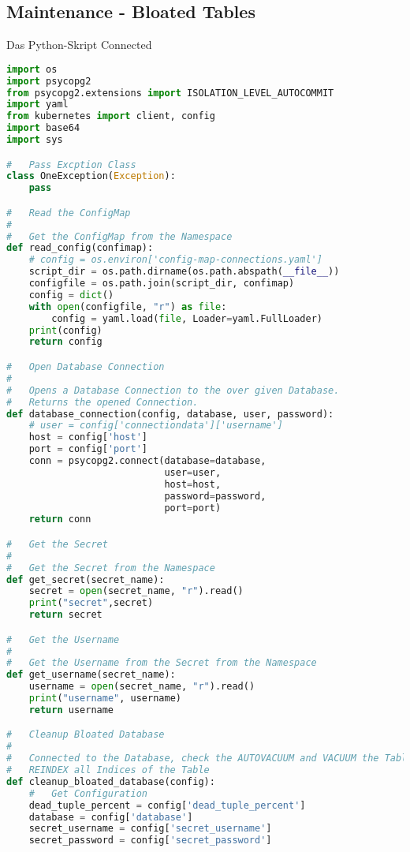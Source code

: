 
\begin{flushleft}
    \subsection{Maintenance - Bloated Tables}
    Das Python-Skript Connected
    \lstset{style=gra_codestyle}
    \begin{lstlisting}[language=python, caption=Maintenance-Tool - Bloated Tables / Indices - ksgr\_postgresql\_maintenance\_bloated\_tables.py,captionpos=b,label={lst:maintenannce-tool-bloated-tables-python},breaklines=true]
import os
import psycopg2
from psycopg2.extensions import ISOLATION_LEVEL_AUTOCOMMIT
import yaml
from kubernetes import client, config
import base64
import sys

#   Pass Excption Class
class OneException(Exception):
    pass

#   Read the ConfigMap
#
#   Get the ConfigMap from the Namespace
def read_config(confimap):
    # config = os.environ['config-map-connections.yaml']
    script_dir = os.path.dirname(os.path.abspath(__file__))
    configfile = os.path.join(script_dir, confimap)
    config = dict()
    with open(configfile, "r") as file:
        config = yaml.load(file, Loader=yaml.FullLoader)
    print(config)
    return config

#   Open Database Connection
#
#   Opens a Database Connection to the over given Database.
#   Returns the opened Connection.
def database_connection(config, database, user, password):
    # user = config['connectiondata']['username']
    host = config['host']
    port = config['port']
    conn = psycopg2.connect(database=database,
                            user=user,
                            host=host,
                            password=password,
                            port=port)
    return conn

#   Get the Secret
#
#   Get the Secret from the Namespace
def get_secret(secret_name):
    secret = open(secret_name, "r").read()
    print("secret",secret)
    return secret

#   Get the Username
#
#   Get the Username from the Secret from the Namespace
def get_username(secret_name):
    username = open(secret_name, "r").read()
    print("username", username)
    return username

#   Cleanup Bloated Database
#
#   Connected to the Database, check the AUTOVACUUM and VACUUM the Table and
#   REINDEX all Indices of the Table
def cleanup_bloated_database(config):
    #   Get Configuration
    dead_tuple_percent = config['dead_tuple_percent']
    database = config['database']
    secret_username = config['secret_username']
    secret_password = config['secret_password']


\end{lstlisting}
\end{flushleft}
